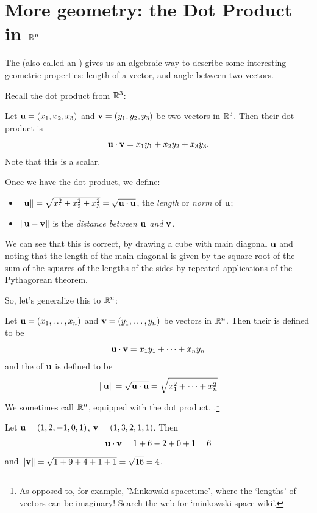 \section{More geometry: the Dot Product in \texorpdfstring{$\mathbb{R}^n$}{Rn}}  

The  (also called an ) gives us
an algebraic way to describe some interesting geometric properties:
length of a vector, and angle between two vectors.

Recall the dot product from $\mathbb{R}^3$:

Let $\mathbf{u} = (x_1,x_2,x_3)$ and $\mathbf{v} = (y_1,y_2,y_3)$ be two vectors in
$\mathbb{R}^3$.  Then their dot product is
$$
\mathbf{u} \cdot \mathbf{v} = x_1y_1 + x_2y_2 + x_3y_3.
$$
Note that this is a scalar.

Once we have the dot product, we define:
\begin{itemize}
\item $\Vert \mathbf{u} \Vert = \sqrt{x_1^2+x_2^2+ x_3^2} = \sqrt{\mathbf{u} \cdot \mathbf{u}}$, the \emph{length} or \emph{norm} of $\mathbf{u}$;
\item $\Vert \mathbf{u} - \mathbf{v} \Vert$ is the \emph{distance between $\mathbf{u}$ and $\mathbf{v}$}.
\end{itemize}
We can see that this is correct, by drawing a cube with main diagonal $\mathbf{u}$
and noting that the length of the main diagonal is given by the square
root of the sum of the squares of the lengths of the sides by repeated
applications of the Pythagorean theorem.

So, let's generalize this to $\mathbb{R}^n$:

\begin{definition}
Let $\mathbf{u} = (x_1,\ldots,x_n)$ and $\mathbf{v} = (y_1,\ldots,y_n)$ be vectors
in $\mathbb{R}^n$.  Then their  is defined to be 
$$
\mathbf{u} \cdot \mathbf{v} = x_1y_1 + \cdots + x_ny_n
$$
and the  of $\mathbf{u}$ is defined to be
$$
\Vert \mathbf{u} \Vert = \sqrt{\mathbf{u} \cdot \mathbf{u}} = \sqrt{x_1^2+\cdots+x_n^2}
$$
We sometimes call $\mathbb{R}^n$, equipped with the dot product, .\footnote{As opposed to, for example, 'Minkowski spacetime', where the `lengths' of vectors can be imaginary! Search the web for `minkowski space wiki'.}
\end{definition}


\begin{myexample}
Let $\mathbf{u} = (1,2,-1,0,1)$, $\mathbf{v} = (1,3,2,1,1)$.  Then
$$
\mathbf{u} \cdot \mathbf{v} = 1+6-2+0+1 = 6
$$
and
$\Vert \mathbf{v} \Vert = \sqrt{1+9+4+1+1} = \sqrt{16}=4$.
\end{myexample}

